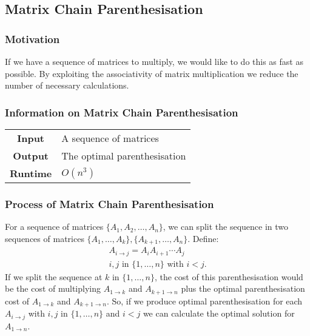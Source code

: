 \documentclass[a4paper, 12pt, twoside]{article}
\begin{document}
\newpage

\subsection{Matrix Chain Parenthesisation}

\subsubsection{Motivation}

If we have a sequence of matrices to multiply, we would like to
do this as fast as possible. By exploiting the associativity of
matrix multiplication we reduce the number of necessary calculations.

\subsubsection{Information on Matrix Chain Parenthesisation}

\begin{center}
      \begin{tabular}{ || c | p{8.5cm} || }
            \hline
                  \textbf{Input} & A sequence of matrices \\
                  \textbf{Output} & The optimal parenthesisation \\
            \hline\hline
                  \textbf{Runtime} & $O(n^3)$ \\
            \hline
      \end{tabular}
\end{center}

\subsubsection{Process of Matrix Chain Parenthesisation}

For a sequence of matrices $\{A_1, A_2, \ldots, A_n\}$, 
we can split the sequence in two sequences of matrices
$\{A_1, \ldots, A_k\}, \{A_{k + 1}, \ldots, A_n\}$. Define:
\begin{gather*}
      A_{i \to j} = A_iA_{i + 1} \cdots A_{j} \\
      i, j \text{ in } \{1, \ldots, n\} \text{ with } i < j.
\end{gather*}
If we split the sequence at $k$ in $\{1, \ldots, n\}$, the cost
of this parenthesisation would be the cost of multiplying 
$A_{1 \to k}$ and $A_{k + 1 \to n}$ plus the optimal parenthesisation 
cost of $A_{1 \to k}$ and $A_{k + 1 \to n}$. 
So, if we produce optimal parenthesisation for
each $A_{i \to j}$ with $i, j$ in $\{1, \ldots, n\}$ and $i < j$
we can calculate the optimal solution for $A_{1 \to n}$.
\end{document}

